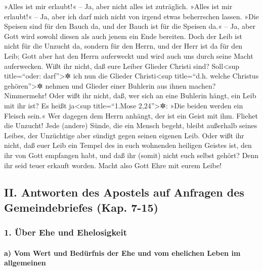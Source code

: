  »Alles ist mir erlaubt!« -- Ja, aber nicht alles ist
zuträglich. »Alles ist mir erlaubt!« -- Ja, aber ich darf mich nicht von
irgend etwas beherrschen lassen.  »Die Speisen sind für
den Bauch da, und der Bauch ist für die Speisen da.« -- Ja, aber Gott
wird sowohl diesen als auch jenem ein Ende bereiten. Doch der Leib ist
nicht für die Unzucht da, sondern für den Herrn, und der Herr ist da für
den Leib;  Gott aber hat den Herrn auferweckt und wird
auch uns durch seine Macht auferwecken.  Wißt ihr nicht,
daß eure Leiber Glieder Christi sind? Soll\textless sup title=``oder:
darf''\textgreater✲ ich nun die Glieder Christi\textless sup
title=``d.h. welche Christus gehören''\textgreater✲ nehmen und Glieder
einer Buhlerin aus ihnen machen? Nimmermehr!  Oder wißt
ihr nicht, daß, wer sich an eine Buhlerin hängt, ein Leib mit ihr ist?
Es heißt ja\textless sup title=``1.Mose 2,24''\textgreater✲: »Die beiden
werden ein Fleisch sein.«  Wer dagegen dem Herrn anhängt,
der ist ein Geist mit ihm.  Fliehet die Unzucht! Jede
(andere) Sünde, die ein Mensch begeht, bleibt außerhalb seines Leibes,
der Unzüchtige aber sündigt gegen seinen eigenen Leib. 
Oder wißt ihr nicht, daß euer Leib ein Tempel des in euch wohnenden
heiligen Geistes ist, den ihr von Gott empfangen habt, und daß ihr
(somit) nicht euch selbst gehört?  Denn ihr seid teuer
erkauft worden. Macht also Gott Ehre mit eurem Leibe!

\hypertarget{ii.-antworten-des-apostels-auf-anfragen-des-gemeindebriefes-kap.-7-15}{%
\subsection{II. Antworten des Apostels auf Anfragen des Gemeindebriefes
(Kap.
7-15)}\label{ii.-antworten-des-apostels-auf-anfragen-des-gemeindebriefes-kap.-7-15}}

\hypertarget{uxfcber-ehe-und-ehelosigkeit}{%
\subsubsection{1. Über Ehe und
Ehelosigkeit}\label{uxfcber-ehe-und-ehelosigkeit}}

\hypertarget{a-vom-wert-und-beduxfcrfnis-der-ehe-und-vom-ehelichen-leben-im-allgemeinen}{%
\paragraph{a) Vom Wert und Bedürfnis der Ehe und vom ehelichen Leben im
allgemeinen}\label{a-vom-wert-und-beduxfcrfnis-der-ehe-und-vom-ehelichen-leben-im-allgemeinen}}

